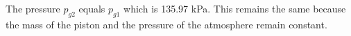 The pressure \( p_{g2} \) equals \( p_{g1} \) which is 135.97 kPa. This remains the same because the mass of the piston and the pressure of the atmosphere remain constant.